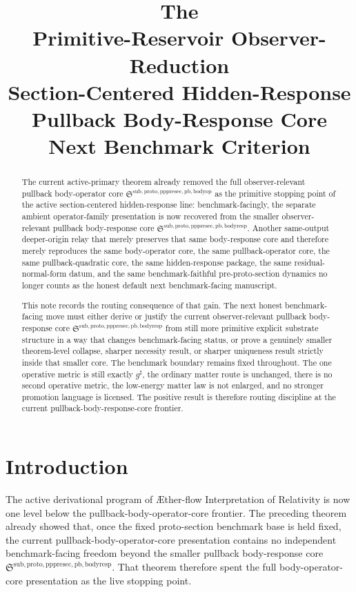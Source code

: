 \documentclass[11pt]{article}
\title{\textbf{The \TheoryName{}}\\[0.4em]
\large Primitive-Reservoir Observer-Reduction\\
\large Section-Centered Hidden-Response\\
\large Pullback Body-Response Core\\
\large Next Benchmark Criterion}
\author{}
\date{}
\newcommand{\Aflow}{\AE{}ther-flow}
\newcommand{\TheoryName}{\Aflow{} Interpretation of Relativity}
\newcommand{\CompletedMetric}{g^{\sharp}}
\newcommand{\PullbackBodyOperatorCore}{\mathfrak S^{\mathrm{sub,proto,pppresec,pb,bodyop}}}
\newcommand{\PullbackBodyResponseCore}{\mathfrak S^{\mathrm{sub,proto,pppresec,pb,bodyresp}}}
\begin{document}
\maketitle

\begin{abstract}
The current active-primary theorem already removed the full observer-relevant pullback body-operator core \(\PullbackBodyOperatorCore\) as the primitive stopping point of the active section-centered hidden-response line: benchmark-facingly, the separate ambient operator-family presentation is now recovered from the smaller observer-relevant pullback body-response core \(\PullbackBodyResponseCore\). Another same-output deeper-origin relay that merely preserves that same body-response core and therefore merely reproduces the same body-operator core, the same pullback-operator core, the same pullback-quadratic core, the same hidden-response package, the same residual-normal-form datum, and the same benchmark-faithful pre-proto-section dynamics no longer counts as the honest default next benchmark-facing manuscript.

This note records the routing consequence of that gain. The next honest benchmark-facing move must either derive or justify the current observer-relevant pullback body-response core \(\PullbackBodyResponseCore\) from still more primitive explicit substrate structure in a way that changes benchmark-facing status, or prove a genuinely smaller theorem-level collapse, sharper necessity result, or sharper uniqueness result strictly inside that smaller core. The benchmark boundary remains fixed throughout. The one operative metric is still exactly \(\CompletedMetric\), the ordinary matter route is unchanged, there is no second operative metric, the low-energy matter law is not enlarged, and no stronger promotion language is licensed. The positive result is therefore routing discipline at the current pullback-body-response-core frontier.
\end{abstract}

\section{Introduction}

The active derivational program of \TheoryName{} is now one level below the pullback-body-operator-core frontier. The preceding theorem already showed that, once the fixed proto-section benchmark base is held fixed, the current pullback-body-operator-core presentation contains no independent benchmark-facing freedom beyond the smaller pullback body-response core \(\PullbackBodyResponseCore\). That theorem therefore spent the full body-operator-core presentation as the live stopping point.
\end{document}
